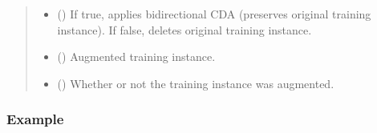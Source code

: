 \documentclass[letterpaper,10pt,english]{sphinxmanual}
\begin{document}
\begin{fulllineitems}
\begin{quote}
\begin{description}
\begin{itemize}
\item {} 
\sphinxAtStartPar
{} () \textendash{} If true, applies bidirectional CDA (preserves original training instance).
If false, deletes original training instance.

\end{itemize}

\sphinxAtStartPar
\begin{itemize}
\item {} 
\sphinxAtStartPar
{} () \textendash{} Augmented training instance.

\item {} 
\sphinxAtStartPar
{} () \textendash{} Whether or not the training instance was augmented.

\end{itemize}


\end{description}\end{quote}
\subsubsection*{Example}


\end{fulllineitems}
\end{document}
